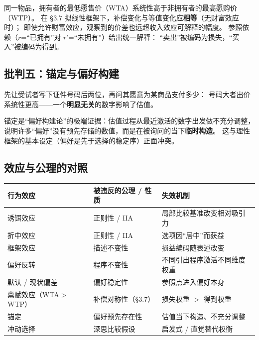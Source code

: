 \begin{remark}
同一物品，拥有者的最低愿售价（WTA）系统性高于非拥有者的最高愿购价（WTP）。
在 §3.7 拟线性框架下，补偿变化与等值变化应\textbf{相等}（无财富效应时）；
即使允许财富效应，观察到的价差也远超收入效应可解释的幅度。
参照依赖（$r$=“已拥有”对 $r'$=“未拥有”）给出统一解释：
“卖出”被编码为损失，“买入”被编码为得到。
\end{remark}

\subsection{批判五：锚定与偏好构建}

\begin{example}[锚定]
先让受试者写下证件号码后两位，再问其愿意为某商品支付多少：
号码大者出价系统性更高——一个\textbf{明显无关}的数字影响了估值。
\end{example}

\begin{remark}
锚定是“偏好构建论”的极端证据：估值过程从最近激活的数字出发做不充分调整，
说明许多“偏好”没有预先存储的数值，而是在被询问的当下\textbf{临时构造}。
这与理性框架的基本设定（偏好是先于选择的稳定序）正面冲突。
\end{remark}

\subsection{效应与公理的对照}

\begin{center}
\small
\begin{tabular}{lll}
\toprule
行为效应 & 被违反的公理 / 性质 & 失效机制 \\
\midrule
诱饵效应 & 正则性 / IIA & 局部比较基准改变相对吸引力 \\
折中效应 & 正则性 / IIA & 选项因“居中”而获益 \\
框架效应 & 描述不变性 & 损益编码随表述改变 \\
偏好反转 & 程序不变性 & 不同引出程序激活不同维度权重 \\
默认 / 现状偏差 & 偏好稳定性 & 参照点进入偏好本身 \\
禀赋效应（WTA$>$WTP） & 补偿对称性（§3.7） & 损失权重 $>$ 得到权重 \\
锚定 & 偏好预先存在性 & 估值当下构造、不充分调整 \\
冲动选择 & 深思比较假设 & 启发式 / 直觉替代权衡 \\
\bottomrule
\end{tabular}
\end{center}

